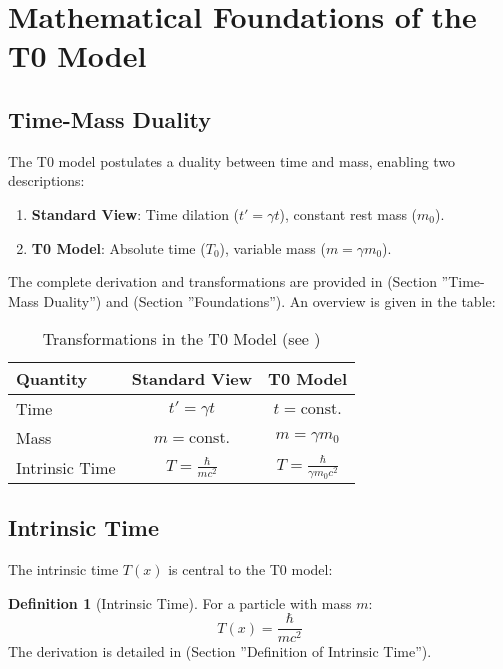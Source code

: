 \documentclass[a4paper,12pt]{article}
\theoremstyle{definition}
\newtheorem{definition}{Definition}[theorem]
\theoremstyle{remark}
\newcommand{\Tfield}{T(x)}
\begin{document}
	\section{Mathematical Foundations of the T0 Model}
	
	\subsection{Time-Mass Duality}
	
	The T0 model postulates a duality between time and mass, enabling two descriptions:
	\begin{enumerate}
		\item \textbf{Standard View}: Time dilation (\(t' = \gamma t\)), constant rest mass (\(m_0\)).
		\item \textbf{T0 Model}: Absolute time (\(T_0\)), variable mass (\(m = \gamma m_0\)).
	\end{enumerate}
	The complete derivation and transformations are provided in \cite{pascher_params_2025} (Section ''Time-Mass Duality'') and \cite{pascher_galaxies_2025} (Section ''Foundations''). An overview is given in the table:
	
	\begin{table}[h]
		\centering
		\begin{tabular}{|l|c|c|}
			\hline
			\textbf{Quantity} & \textbf{Standard View} & \textbf{T0 Model} \\
			\hline
			Time & \(t' = \gamma t\) & \(t = \text{const.}\) \\
			Mass & \(m = \text{const.}\) & \(m = \gamma m_0\) \\
			Intrinsic Time & \(T = \frac{\hbar}{m c^2}\) & \(T = \frac{\hbar}{\gamma m_0 c^2}\) \\
			\hline
		\end{tabular}
		\caption{Transformations in the T0 Model (see \cite{pascher_params_2025})}
	\end{table}
	
	\subsection{Intrinsic Time}
	
	The intrinsic time \(\Tfield\) is central to the T0 model:
	
	\begin{definition}[Intrinsic Time]
		For a particle with mass \(m\):
		\begin{equation}
			\Tfield = \frac{\hbar}{m c^2}
		\end{equation}
		The derivation is detailed in \cite{pascher_params_2025} (Section ''Definition of Intrinsic Time'').
	\end{definition}
	
\end{document}
